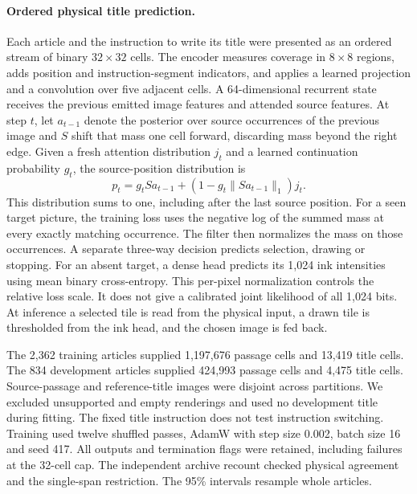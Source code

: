 \paragraph{Ordered physical title prediction.}
Each article and the instruction to write its title were presented as an
ordered stream of binary $32\times32$ cells. The encoder measures coverage
in $8\times8$ regions, adds position and instruction-segment indicators,
and applies a learned projection and a convolution over five adjacent
cells. A 64-dimensional recurrent state receives the previous emitted
image features and attended source features. At step $t$, let $a_{t-1}$
denote the posterior over source occurrences of the previous image and $S$
shift that mass one cell forward, discarding mass beyond the right edge.
Given a fresh attention distribution $j_t$ and a learned continuation
probability $g_t$, the source-position distribution is
\[
 p_t=g_t S a_{t-1}+(1-g_t\lVert S a_{t-1}\rVert_1)j_t.
\]
This distribution sums to one, including after the last source position.
For a seen target picture, the training loss uses the negative log of the
summed mass at every exactly matching occurrence. The filter then
normalizes the mass on those occurrences. A separate three-way decision
predicts selection, drawing or stopping. For an absent target, a dense
head predicts its 1,024 ink intensities using mean binary cross-entropy.
This per-pixel normalization controls the relative loss scale. It does not
give a calibrated joint likelihood of all 1,024 bits. At inference a
selected tile is read from the physical input, a drawn tile is thresholded
from the ink head, and the chosen image is fed back.

The 2,362 training articles supplied 1,197,676 passage cells and 13,419
title cells. The 834 development articles supplied 424,993 passage cells
and 4,475 title cells. Source-passage and reference-title images were
disjoint across partitions. We excluded unsupported and empty renderings
and used no development title during fitting. The fixed title instruction
does not test instruction switching. Training used twelve shuffled passes,
AdamW with step size 0.002, batch size 16 and seed 417. All outputs and
termination flags were retained, including failures at the 32-cell cap.
The independent archive recount checked physical agreement and the
single-span restriction. The 95\% intervals resample whole articles.
